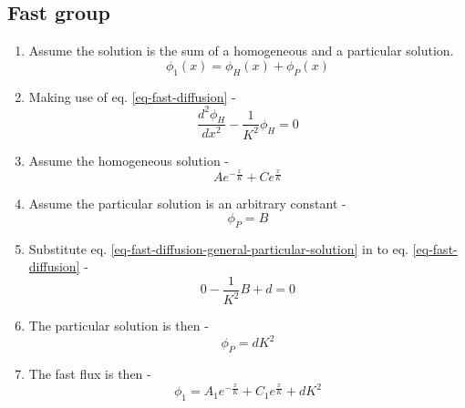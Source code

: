 \documentclass[11pt,a4paper]{article}
\begin{document}
\subsection{Fast group}
\begin{enumerate}[leftmargin=*,topsep=0pt]
    \item Assume the solution is the sum of a homogeneous and a particular solution.
        \begin{equation}
            \phi_1(x)=\phi_H(x)+\phi_P(x)
        \end{equation}
    \item Making use of eq. \ref{eq-fast-diffusion} -  
        \begin{equation}
            \frac{d^2\phi_H}{dx^2}-\frac{1}{K^2}\phi_H=0
        \end{equation}
    \item Assume the homogeneous solution -
        \begin{equation} \label{eq-fast-diffusion-homogeneous-solution}
            Ae^{-\frac{x}{K}}+Ce^{\frac{x}{K}}
        \end{equation}
    \item Assume the particular solution is an arbitrary constant - 
        \begin{equation} \label{eq-fast-diffusion-general-particular-solution}
            \phi_P=B
        \end{equation}
    \item Substitute eq. \ref{eq-fast-diffusion-general-particular-solution} in to eq. \ref{eq-fast-diffusion} - 
        \begin{equation}
            0-\frac{1}{K^2}B+d=0
        \end{equation}
    \item The particular solution is then - 
        \begin{equation} \label{eq-fast-diffusion-particular-solution}
            \phi_P=dK^2
        \end{equation}
    \item The fast flux is then -
        \begin{equation} \label{eq-fast-diffusion-solution}
            \phi_1=A_1e^{-\frac{x}{K}}+C_1e^{\frac{x}{K}}+dK^2
        \end{equation}
\end{enumerate}
\end{document}

